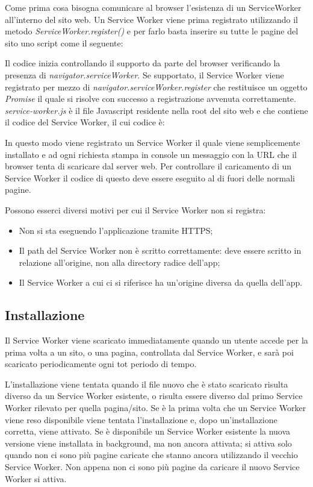 \documentclass[11pt ,a4paper , twoside , openright ]{book}
\begin{document}
	Come prima cosa bisogna comunicare al browser l’esistenza di un ServiceWorker all’interno del sito web. Un Service Worker viene prima registrato utilizzando il metodo \textit{ServiceWorker.register()} e per farlo basta inserire su tutte le pagine del sito uno script come il seguente:
	
	Il codice inizia controllando il supporto da parte del browser verificando la presenza di \textit{navigator.serviceWorker}. Se supportato, il Service Worker viene registrato per mezzo di \textit{navigator.serviceWorker.register} che restituisce un oggetto \textit{Promise} il quale si risolve con successo a registrazione avvenuta correttamente.
	\textit{service-worker.js} è il file Javascript residente nella root del sito web e che contiene il codice del Service Worker, il cui codice è:
	\pagebreak
	
	In questo modo viene registrato un Service Worker il quale viene semplicemente installato e ad ogni richiesta stampa in console un messaggio con la URL che il browser tenta di scaricare dal server web. Per controllare il caricamento di un Service Worker il codice di questo deve essere eseguito al di fuori delle normali pagine.
	
	Possono esserci diversi motivi per cui il Service Worker non si registra:
	\begin{itemize}
		\item Non si sta eseguendo l'applicazione tramite HTTPS;
		\item Il path del Service Worker non è scritto correttamente: deve essere scritto in relazione all'origine, non alla directory radice dell'app;
		\item Il Service Worker a cui ci si riferisce ha un'origine diversa da quella dell'app.
	\end{itemize}
	
	\subsection{Installazione}
	Il Service Worker viene scaricato immediatamente quando un utente accede per la prima volta a un sito, o una pagina, controllata dal Service Worker, e sarà poi scaricato periodicamente ogni tot periodo di tempo.
	
	L'installazione viene tentata quando il file nuovo che è stato scaricato risulta diverso da un Service Worker esistente, o risulta essere diverso dal primo Service Worker rilevato per quella pagina/sito. Se è la prima volta che un Service Worker viene reso disponibile viene tentata l'installazione e, dopo un'installazione corretta, viene attivato. Se è disponibile un Service Worker esistente la nuova versione viene installata in background, ma non ancora attivata; si attiva solo quando non ci sono più pagine caricate che stanno ancora utilizzando il vecchio Service Worker. Non appena non ci sono più pagine da caricare il nuovo Service Worker si attiva.
	
\end{document}

